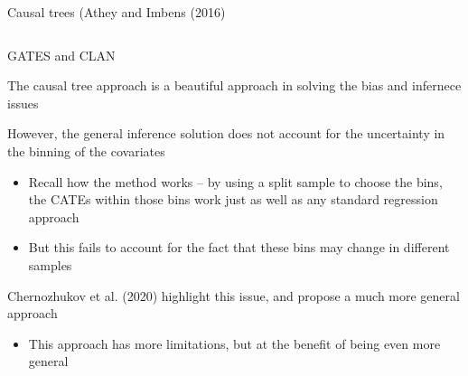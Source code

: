 \documentclass[notes,11pt, aspectratio=169]{beamer}
\newenvironment{wideitemize}{\itemize\addtolength{\itemsep}{10pt}}{\enditemize}
\begin{document}
\begin{frame}{Causal trees (Athey and Imbens (2016)}
\begin{columns}[onlytextwidth, T]
\begin{column}{.5\textwidth}
      \end{column}%
    \end{columns}
\end{frame}

\begin{frame}{GATES and CLAN}
  \begin{wideitemize}
  \item The causal tree approach is a beautiful approach in solving
    the bias and infernece issues
  \item However, the general inference solution does not account for
    the uncertainty in the binning of the covariates
    \begin{itemize}
    \item Recall how the method works -- by using a split sample to
      choose the bins, the CATEs within those bins work just as well
      as any standard regression approach
    \item But this fails to account for the fact that these bins may
      change in different samples
    \end{itemize}
  \item Chernozhukov et al. (2020) highlight this issue, and propose a
    much more general approach
    \begin{itemize}
    \item This approach has more limitations, but at the benefit of
      being even more general
    \end{itemize}
  \end{wideitemize}
\end{frame}
\end{document}
